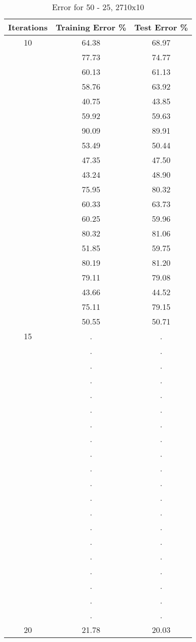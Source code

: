 \documentclass[12pt]{article}
\begin{document}
\begin{table}[h]
	\begin{center}
		\caption{Error for 50 - 25, 2710x10}
		\label{tab:table2}
		\begin{tabular}{|c|c|c|}
			\hline
			\textbf{Iterations} & \textbf{Training Error \%} & \textbf{Test Error \%} \\
			\hline
			10 & 64.38 & 68.97\\
			& 77.73 & 74.77\\
			& 60.13 & 61.13\\
			& 58.76 & 63.92\\
			& 40.75 & 43.85\\
			& 59.92 & 59.63\\
			& 90.09 & 89.91\\
			& 53.49 & 50.44\\
			& 47.35 & 47.50\\
			& 43.24 & 48.90\\
			& 75.95 & 80.32\\
			& 60.33 & 63.73\\
			& 60.25 & 59.96\\
			& 80.32 & 81.06\\
			& 51.85 & 59.75\\
			& 80.19 & 81.20\\
			& 79.11 & 79.08\\
			& 43.66 & 44.52\\
			& 75.11 & 79.15\\
			& 50.55 & 50.71\\
			\hline
			15 & . & .\\
			& . & .\\
			& . & .\\
			& . & .\\
			& . & .\\
			& . & .\\
			& . & .\\
			& . & .\\
			& . & .\\
			& . & .\\
			& . & .\\
			& . & .\\
			& . & .\\
			& . & .\\
			& . & .\\
			& . & .\\
			& . & .\\
			& . & .\\
			& . & .\\
			& . & .\\
			\hline
			20 & 21.78 & 20.03 \\
			\hline
		\end{tabular}
	\end{center}
\end{table}
\end{document}
